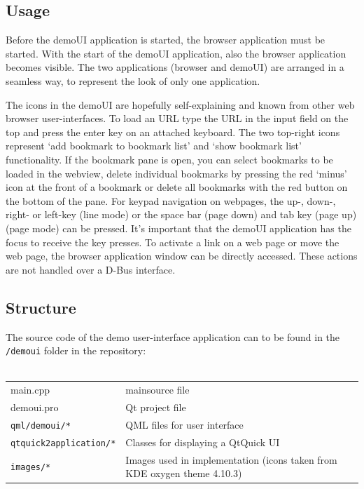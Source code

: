 \documentclass{pelagicore}
\begin{document}
\subsection{Usage}
Before the demoUI application is started, the browser application must be
started. With the start of the demoUI application, also the browser application
becomes visible. The two applications (browser and demoUI) are arranged in a
seamless way, to represent the look of only one application.

The icons in the demoUI are hopefully self-explaining and known from other web
browser user-interfaces. To load an URL type the URL in the input field on the
top and press the enter key on an attached keyboard. The two top-right icons
represent `add bookmark to bookmark list' and `show bookmark list'
functionality. If the bookmark pane is open, you can select bookmarks to be
loaded in the webview, delete individual bookmarks by pressing the red `minus'
icon at the front of a bookmark or delete all bookmarks with the red button on
the bottom of the pane. For keypad navigation on webpages, the up-, down-,
right- or left-key (line mode) or the space bar (page down) and tab key (page
up) (page mode) can be pressed. It's important that the demoUI application has
the focus to receive the key presses. To activate a link on a web page or move
the web page, the browser application window can be directly accessed. These
actions are not handled over a D-Bus interface.

\subsection{Structure}
The source code of the demo user-interface application can to be found in the
{\tt /demoui} folder in the repository:
\\\\
\begin{tabularx}{0.9\textwidth}{l X}
    main.cpp                    & mainsource file \\
    demoui.pro                  & Qt project file \\
    {\tt qml/demoui/*}          & QML files for user interface \\
    {\tt qtquick2application/*} & Classes for displaying a QtQuick UI \\
    {\tt images/*}              & Images used in implementation (icons taken
                                  from KDE oxygen theme 4.10.3)
\end{tabularx}
\\\\
\end{document}
